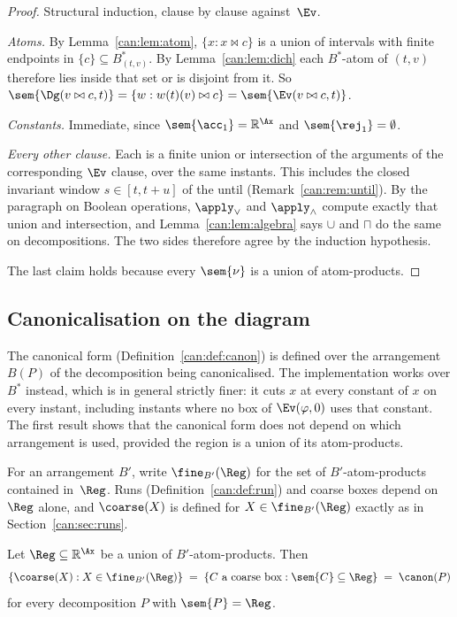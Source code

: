 \begin{proof}
Structural induction, clause by clause against~$\Ev$.

\emph{Atoms.} By Lemma~\ref{can:lem:atom}, $\{x : x\bowtie c\}$ is a union of
intervals with finite endpoints in $\{c\}\subseteq B^*_{(t,v)}$. By
Lemma~\ref{can:lem:dich} each $B^*$-atom of $(t,v)$ therefore lies inside that set
or is disjoint from it. So $\sem{\Dg(v\bowtie c,t)} = \{w : w(t)(v)\bowtie c\}
= \sem{\Ev(v\bowtie c,t)}$.

\emph{Constants.} Immediate, since $\sem{\acc_1}=\mathbb{R}^{\Ax}$ and
$\sem{\rej_1}=\emptyset$.

\emph{Every other clause.} Each is a finite union or intersection of the
arguments of the corresponding $\Ev$ clause, over the same instants. This
includes the closed invariant window $s\in[t,t+u]$ of the until
(Remark~\ref{can:rem:until}). By the paragraph on Boolean operations, $\apply_\vee$
and $\apply_\wedge$ compute exactly that union and intersection, and
Lemma~\ref{can:lem:algebra} says $\cup$ and $\sqcap$ do the same on
decompositions. The two sides therefore agree by the induction hypothesis.

The last claim holds because every $\sem{\nu}$ is a union of atom-products.
\end{proof}

\subsection{Canonicalisation on the diagram}\label{sec:method-canon}

The canonical form (Definition~\ref{can:def:canon}) is defined over the arrangement
$B(P)$ of the decomposition being canonicalised. The implementation works over
$B^*$ instead, which is in general strictly finer: it cuts $x$ at every
constant of $x$ on every instant, including instants where no box of
$\Ev(\varphi,0)$ uses that constant. The first result shows that the canonical
form does not depend on which arrangement is used, provided the region is a
union of its atom-products.

For an arrangement $B'$, write $\fine_{B'}(\Reg)$ for the set of
$B'$-atom-products contained in~$\Reg$. Runs (Definition~\ref{can:def:run}) and
coarse boxes depend on $\Reg$ alone, and $\coarse(X)$ is defined for
$X\in\fine_{B'}(\Reg)$ exactly as in Section~\ref{can:sec:runs}.

\begin{lemma}\label{lem:arr-indep}
Let $\Reg\subseteq\mathbb{R}^{\Ax}$ be a union of $B'$-atom-products. Then
\[
  \{\coarse(X) : X\in\fine_{B'}(\Reg)\}
  \;=\; \{C \text{ a coarse box} : \sem{C}\subseteq\Reg\}
  \;=\; \canon(P)
\]
for every decomposition $P$ with $\sem{P}=\Reg$.
\end{lemma}

